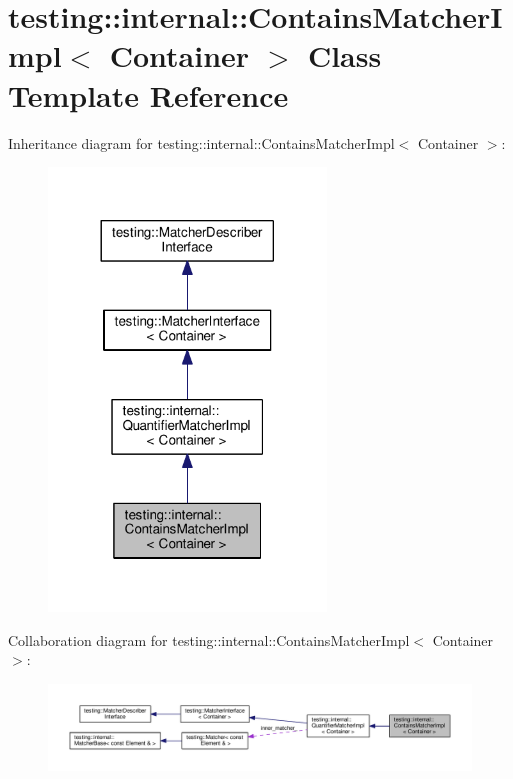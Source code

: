 \hypertarget{classtesting_1_1internal_1_1ContainsMatcherImpl}{}\section{testing\+:\+:internal\+:\+:Contains\+Matcher\+Impl$<$ Container $>$ Class Template Reference}
\label{classtesting_1_1internal_1_1ContainsMatcherImpl}


Inheritance diagram for testing\+:\+:internal\+:\+:Contains\+Matcher\+Impl$<$ Container $>$\+:\nopagebreak
\begin{figure}[H]
\begin{center}
\leavevmode
\includegraphics[width=209pt]{classtesting_1_1internal_1_1ContainsMatcherImpl__inherit__graph}
\end{center}
\end{figure}


Collaboration diagram for testing\+:\+:internal\+:\+:Contains\+Matcher\+Impl$<$ Container $>$\+:\nopagebreak
\begin{figure}[H]
\begin{center}
\leavevmode
\includegraphics[width=350pt]{classtesting_1_1internal_1_1ContainsMatcherImpl__coll__graph}
\end{center}
\end{figure}
